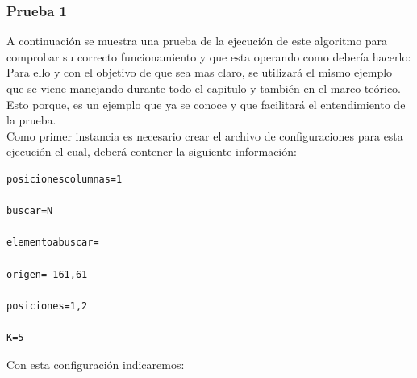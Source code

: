 \subsubsection{Prueba 1}
A continuación se muestra una prueba de la ejecución de este algoritmo para comprobar su correcto funcionamiento y que esta operando como debería hacerlo:
\\
Para ello y con el objetivo de que sea mas claro, se utilizará el mismo ejemplo que se viene manejando durante todo el capitulo y también en el marco teórico. 
\\
Esto porque, es un ejemplo que ya se conoce y que facilitará el entendimiento de la prueba. 
\\
Como primer instancia es necesario crear el archivo de configuraciones para esta ejecución el cual, deberá contener la siguiente información:
\label{posiciones}
\begin{verbatim}
posicionescolumnas=1

buscar=N

elementoabuscar=

origen= 161,61

posiciones=1,2

K=5
\end{verbatim} 
Con esta configuración indicaremos:
